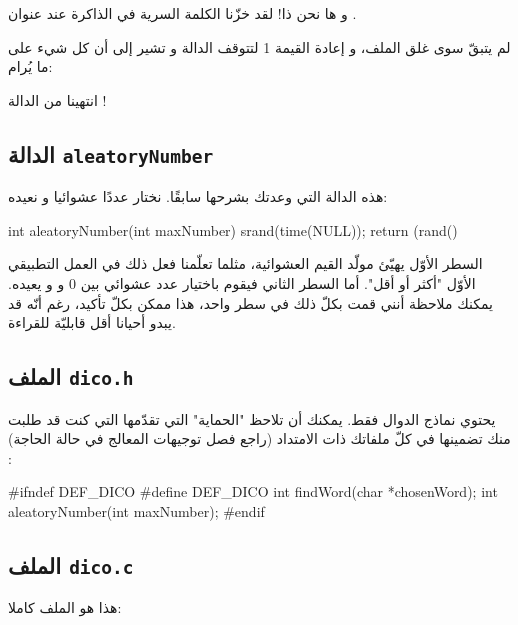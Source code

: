 و ها نحن ذا! لقد خزّنا الكلمة السرية في الذاكرة عند عنوان
.

لم يتبقّ سوى غلق الملف، و إعادة القيمة 1 لتتوقف الدالة و تشير إلى أن كل شيء على ما يُرام:

\begin{Csource}
  fclose(dico);
  return 1; // Everything is okay, return 1
}
\end{Csource}
انتهينا من الدالة
 !

\subsection{الدالة
\texttt{aleatoryNumber}}
هذه الدالة التي وعدتك بشرحها سابقًا. نختار عددًا عشوائيا و نعيده:

\begin{Csource}
int aleatoryNumber(int maxNumber)
{
    srand(time(NULL));
    return (rand() %
}
\end{Csource}

السطر الأوّل يهيّئ مولّد القيم العشوائية، مثلما تعلّمنا فعل ذلك في العمل التطبيقي الأوّل "أكثر أو أقل". أما السطر الثاني فيقوم باختيار عدد عشوائي بين $ 0 $
و
و يعيده. يمكنك ملاحظة أنني قمت بكلّ ذلك في سطر واحد، هذا ممكن بكلّ تأكيد، رغم أنّه قد يبدو أحيانا أقل قابليّة للقراءة.

\subsection{الملف \texttt{dico.h}}

يحتوي نماذج الدوال فقط. يمكنك أن تلاحظ "الحماية" التي تقدّمها
التي كنت قد طلبت منك تضمينها في كلّ ملفاتك ذات الامتداد
(راجع فصل توجيهات المعالج في حالة الحاجة) :

\begin{Csource}
#ifndef DEF_DICO
#define DEF_DICO
int findWord(char *chosenWord);
int aleatoryNumber(int maxNumber);
#endif
\end{Csource}

\subsection{الملف \texttt{dico.c}}

هذا هو الملف
كاملا:

